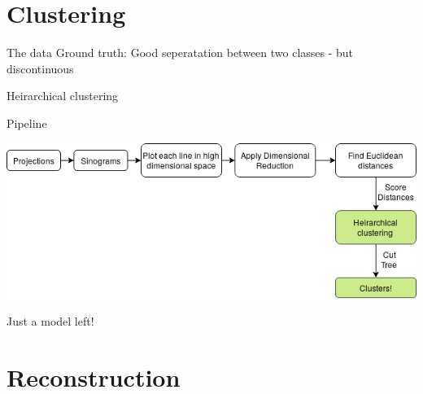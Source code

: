 \documentclass[t, 11pt, xcolor=dvipsnames]{beamer}
\newcommand{\placetextbox}[4][center]{%
  \tikz[remember picture,overlay,x=\paperwidth,y=\paperheight]{%
    \node[anchor=#1,inner sep=0pt]
    at ($(current page.south west)+(#2,#3)$) {#4};
  }%
}
\begin{document}
\section{Clustering}
\begin{frame}{The data}
  Ground truth: Good seperatation between two classes - but discontinuous

\end{frame}

\begin{frame}{Heirarchical clustering}
\end{frame}

\begin{frame}[fragile]{Pipeline}
  \begin{center}\includegraphics[width=1\textwidth]{images/third_pipeline.png}
    \end{center}


    \pause
    Just a model left!
\end{frame}

\section{Reconstruction}
\end{document}
